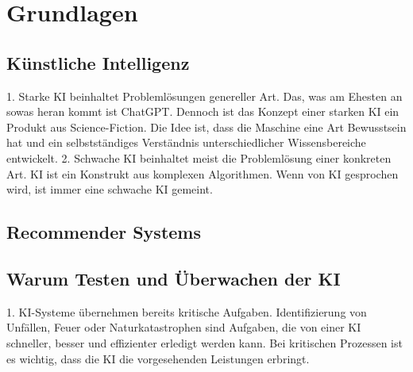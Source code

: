 \chapter{Grundlagen}
\label{chap:grundlagen}

\section{Künstliche Intelligenz}
\label{sec:kunstlicheintelligenz}

1. Starke KI beinhaltet Problemlösungen genereller Art. Das, was am Ehesten an sowas heran kommt ist ChatGPT. Dennoch ist das Konzept einer starken KI ein Produkt aus Science-Fiction. Die Idee ist, dass die Maschine eine Art Bewusstsein hat und ein selbstständiges Verständnis unterschiedlicher Wissensbereiche entwickelt. 
2. Schwache KI beinhaltet meist die Problemlösung einer konkreten Art. KI ist ein Konstrukt aus komplexen Algorithmen. Wenn von KI gesprochen wird, ist immer eine schwache KI gemeint.

\section{Recommender Systems}
\label{sec:recommendersystems}

\section{Warum Testen und Überwachen der KI}
\label{sec:testen}

1. KI-Systeme übernehmen bereits kritische Aufgaben. Identifizierung von Unfällen, Feuer oder Naturkatastrophen sind Aufgaben, die von einer KI schneller, besser und effizienter erledigt werden kann. Bei kritischen Prozessen ist es wichtig, dass die KI die vorgesehenden Leistungen erbringt.
\newpage





